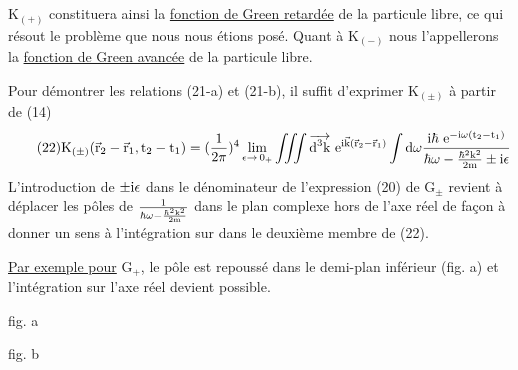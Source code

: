 K$_{(+)}$ constituera ainsi la \ul{fonction de Green retardée} de la
particule libre, ce qui résout le problème que nous nous étions posé.
Quant à K$_{(-)}$ nous l'appellerons la \ul{fonction de Green avancée} de la
particule libre.

Pour démontrer les relations (21-a) et (21-b), il suffit
d'exprimer K$_{(\pm)}$ à partir de (14)
\[
\tag{22}\text{K}_{(\pm)}(\vec{\text{r}}_2-\vec{\text{r}}_1,\text{t}_2-\text{t}_1)=(\frac{1}{2\pi})^4
\lim_{\epsilon\to\,0_+}\iiint\overrightarrow{\text{d}^3\text{k}}\text{ e}^{\text{i}\vec{\text{k}}(\vec{\text{r}}_2-\vec{\text{r}}_1)}
\int\text{d}\omega\frac{\text{i}\hbar\text{ e}^{-\text{i}\omega(\text{t}_2-\text{t}_1)}}{\hbar\omega-\frac{\hbar^2\text{k}^2}{2\text{m}}\pm\text{i}\epsilon}
\]
L'introduction de $\pm\text{i}\epsilon$ dans le dénominateur de l'expression (20) de G$_\pm$
revient à déplacer les pôles de $\frac{1}{\hbar\omega-\frac{\hbar^2\text{k}^2}{2\text{m}}}$ dans le plan complexe hors
de l'axe réel de façon à donner un sens à l'intégration sur  dans le
deuxième membre de (22).

\ul{Par exemple pour} G$_+$, le pôle est repoussé dans le demi-plan
inférieur (fig. a) et l'intégration sur l'axe réel devient possible.

\vspace{0.3cm}
\begin{minipage}[c]{.45\linewidth}
\begin{center} 

fig. a
\end{center}
\end{minipage}
\hfill
\begin{minipage}[c]{.45\linewidth}
\begin{center} 

fig. b
\end{center}
\end{minipage}
\vspace{0.3cm}

